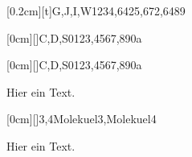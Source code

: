 \documentclass[./main.tex]{subfiles}
\begin{document}


\kastenarray[2.5cm]{3cm}[0.2cm][t]{G,J,I,W}{1234,6425,672,6489}

\kastenarray[3cm]{4cm}[0cm][]{C,D,S}{0123,4567,890a}

\kastenarray{2cm}[0cm][]{C,D,S}{0123,4567,890a}

Hier ein Text.


\kastenarray[7cm]{7cm}[0cm][]{3,4}{Molekuel3,Molekuel4}

Hier ein Text.
\newpage
\aufgabenende
\end{document}
